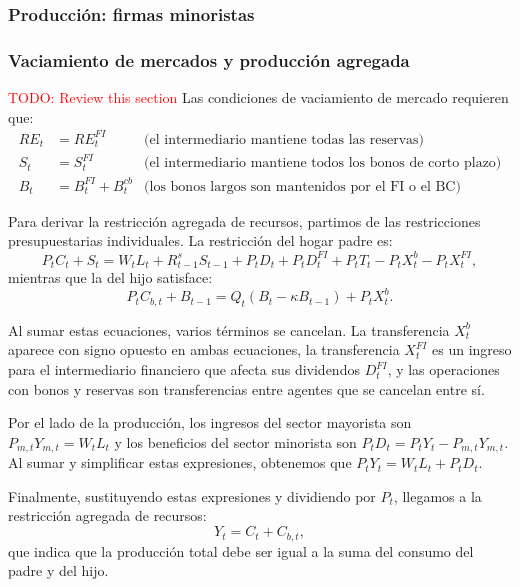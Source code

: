 \documentclass[../../entrega.tex]{subfiles}
\begin{document}
\subsubsection{Producción: firmas minoristas}

\subsubsection{Vaciamiento de mercados y producción agregada}
\textcolor{red}{TODO: Review this section}
Las condiciones de vaciamiento de mercado requieren que:
\begin{align*}
    RE_t & = RE_t^{FI}            & \text{(el intermediario mantiene todas las reservas)}             \\
    S_t  & = S_t^{FI}             & \text{(el intermediario mantiene todos los bonos de corto plazo)} \\
    B_t  & = B_t^{FI} + B_t^{c b} & \text{(los bonos largos son mantenidos por el FI o el BC)}
\end{align*}

Para derivar la restricción agregada de recursos, partimos de las restricciones presupuestarias individuales. La restricción del hogar padre es:
\begin{equation*}
    P_t C_t + S_t = W_t L_t + R_{t-1}^s S_{t-1} + P_t D_t + P_t D_t^{FI} + P_t T_t - P_t X_t^b - P_t X_t^{FI},
\end{equation*}
mientras que la del hijo satisface:
\begin{equation*}
    P_t C_{b,t} + B_{t-1} = Q_t(B_t - \kappa B_{t-1}) + P_t X_t^b.
\end{equation*}

Al sumar estas ecuaciones, varios términos se cancelan. La transferencia $X_t^b$ aparece con signo opuesto en ambas ecuaciones, la transferencia $X_t^{FI}$ es un ingreso para el intermediario financiero que afecta sus dividendos $D_t^{FI}$, y las operaciones con bonos y reservas son transferencias entre agentes que se cancelan entre sí.

Por el lado de la producción, los ingresos del sector mayorista son $P_{m,t}Y_{m,t} = W_t L_t$ y los beneficios del sector minorista son $P_t D_t = P_t Y_t - P_{m,t}Y_{m,t}$. Al sumar y simplificar estas expresiones, obtenemos que $P_t Y_t = W_t L_t + P_t D_t$.

Finalmente, sustituyendo estas expresiones y dividiendo por $P_t$, llegamos a la restricción agregada de recursos:
\begin{equation}
    Y_t = C_t + C_{b,t},
\end{equation}
que indica que la producción total debe ser igual a la suma del consumo del padre y del hijo.
\end{document}
